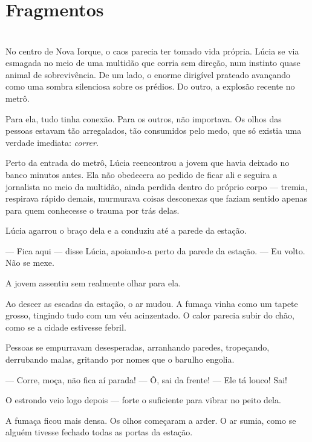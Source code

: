\newpage
\ifdefined\useChapters
\chapter{Fragmentos}
\else
\chapter{}
\fi

No centro de Nova Iorque, o caos parecia ter tomado vida própria.  
Lúcia se via esmagada no meio de uma multidão que corria sem direção, num instinto quase animal de sobrevivência.  
De um lado, o enorme dirigível prateado avançando como uma sombra silenciosa sobre os prédios.  
Do outro, a explosão recente no metrô.  

Para ela, tudo tinha conexão.  
Para os outros, não importava.  
Os olhos das pessoas estavam tão arregalados, tão consumidos pelo medo, que só existia uma verdade imediata: \emph{correr}.

Perto da entrada do metrô, Lúcia reencontrou a jovem que havia deixado no banco minutos antes. Ela não obedecera ao pedido de ficar ali e seguira a jornalista no meio da multidão, ainda perdida dentro do próprio corpo — tremia, respirava rápido demais, murmurava coisas desconexas que faziam sentido apenas para quem conhecesse o trauma por trás delas.

Lúcia agarrou o braço dela e a conduziu até a parede da estação.

— Fica aqui — disse Lúcia, apoiando-a perto da parede da estação. — Eu volto. Não se mexe.

A jovem assentiu sem realmente olhar para ela.

\bigskip

Ao descer as escadas da estação, o ar mudou.  
A fumaça vinha como um tapete grosso, tingindo tudo com um véu acinzentado.  
O calor parecia subir do chão, como se a cidade estivesse febril.

Pessoas se empurravam desesperadas, arranhando paredes, tropeçando, derrubando malas, gritando por nomes que o barulho engolia.

— Corre, moça, não fica aí parada!  
— Ô, sai da frente!  
— Ele tá louco! Sai!  

O estrondo veio logo depois — forte o suficiente para vibrar no peito dela.

A fumaça ficou mais densa.  
Os olhos começaram a arder.  
O ar sumia, como se alguém tivesse fechado todas as portas da estação.

